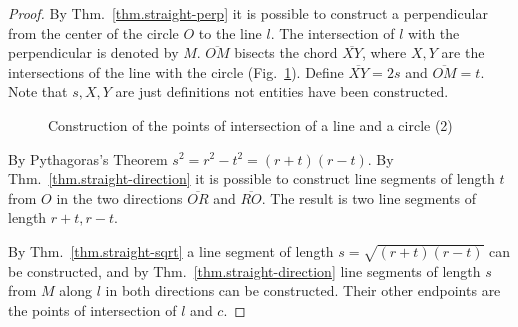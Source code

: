 \begin{proof}
By Thm.~\ref{thm.straight-perp} it is possible to construct a perpendicular from the center of the circle $O$ to the line $l$. The intersection of $l$ with the perpendicular is denoted by $M$. $\overline{OM}$ bisects the chord $\overline{XY}$, where $X, Y$ are the intersections of the line with the circle (Fig.~\ref{f.se-line-circle2}). Define $\overline{XY}=2s$ and $\overline{OM}=t$. Note that $s,X,Y$ are just definitions not entities  have been constructed.
\begin{figure}[b]
\begin{center}
\end{center}
\caption{Construction of the points of intersection of a line and a circle (2)}\label{f.se-line-circle2}
\end{figure}

By Pythagoras's Theorem $s^2=r^2-t^2=(r+t)(r-t)$. By Thm.~\ref{thm.straight-direction} it is possible to construct line segments of length $t$ from $O$ in the two directions $\overline{OR}$ and $\overline{RO}$. The result is two line segments of length $r+t,r-t$.

By Thm.~\ref{thm.straight-sqrt} a line segment of length $s=\sqrt{(r+t)(r-t)}$ can be constructed, and by Thm.~\ref{thm.straight-direction} line segments of length $s$ from $M$ along $l$ in both directions can be constructed. Their other endpoints are the points of intersection of $l$ and $c$.
\end{proof}

